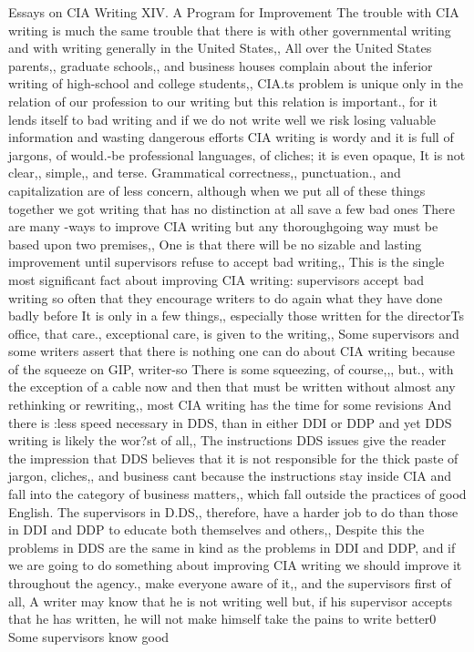 \documentclass[
    oneside,
    11pt,
    draft
]{memoir}
\begin{document}
Essays on CIA Writing XIV. A Program for Improvement The trouble with CIA writing is much the same trouble that there is with other governmental writing and with writing generally in the United States,, All over the United States parents,, graduate schools,, and business houses complain about the inferior writing of high-school and college students,, CIA.ts problem is unique only in the relation of our profession to our writing but this relation is important., for it lends itself to bad writing and if we do not write well we risk losing valuable information and wasting dangerous efforts CIA writing is wordy and it is full of jargons, of would.-be professional languages, of cliches; it is even opaque, It is not clear,, simple,, and terse. Grammatical correctness,, punctuation., and capitalization are of less concern, although when we put all of these things together we got writing that has no distinction at all save a few bad ones There are many -ways to improve CIA writing but any thoroughgoing way must be based upon two premises,, One is that there will be no sizable and lasting improvement until supervisors refuse to accept bad writing,, This is the single most significant fact about improving CIA writing: supervisors accept bad writing so often that they encourage writers to do again what they have done badly before It is only in a few things,, especially those written for the directorTs office, that care., exceptional care, is given to the writing,, Some supervisors and some writers assert that there is nothing one can do about CIA writing because of the squeeze on GIP, writer-so There is some squeezing, of course,,, but., with the exception of a cable now and then that must be written without almost any rethinking or rewriting,, most CIA writing has the time for some revisions And there is :less speed necessary in DDS, than in either DDI or DDP and yet DDS writing is likely the wor?st of all,, The instructions DDS issues give the reader the impression that DDS believes that it is not responsible for the thick paste of jargon, cliches,, and business cant because the instructions stay inside CIA and fall into the category of business matters,, which fall outside the practices of good English. The supervisors in D.DS,, therefore, have a harder job to do than those in DDI and DDP to educate both themselves and others,, Despite this the problems in DDS are the same in kind as the problems in DDI and DDP, and if we are going to do something about improving CIA writing we should improve it throughout the agency., make everyone aware of it,, and the supervisors first of all, A writer may know that he is not writing well but, if his supervisor accepts that he has written, he will not make himself take the pains to write better0 Some supervisors know good
\end{document}
